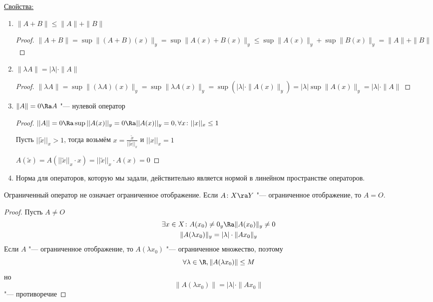 \underline{Свойства:}
\begin{enumerate}
\item
	$\|A + B\| \le \|A\| + \|B\|$
	\begin{proof}
		$\|A + B\| = \sup \|(A + B)(x)\|_y = \sup \|A(x) + B(x)\|_y \le \sup \|A(x)\|_y + \sup \|B(x)\|_y = \|A\| + \|B\|$
	\end{proof}

\item
	$\|\lambda A\| = |\lambda| \cdot \|A\|$
	\begin{proof}
		$\|\lambda A\| = \sup \| (\lambda A)(x) \|_y = \sup \| \lambda A(x) \|_y = \sup( |\lambda| \cdot \|A(x) \|_y) = |\lambda| \sup \|A(x)\|_y = |\lambda| \cdot \|A\|$
	\end{proof}

\item
	$\|A\| = 0 \Ra A$ "--- нулевой оператор
	\begin{proof}
		$||A|| = 0 \Ra \sup ||A(x)||_y = 0 \Ra ||A(x)||_y = 0, \forall x \colon ||x||_x \le 1$
		
		Пусть $||\widetilde{x}||_x > 1$, тогда возьмём $x = \frac{\widetilde{x}}{||\widetilde{x}||_x}$ и $||x||_x = 1$
		
		$A(\widetilde{x}) = A(||\widetilde{x}||_x \cdot x) = ||\widetilde{x}||_x \cdot A(x) = 0$
	\end{proof}

\item
	Норма для операторов, которую мы задали, действительно является нормой в линейном пространстве операторов.
\end{enumerate}

\begin{Rem}
	Ограниченный оператор не означает ограниченное отображение. Если $A \colon X \ra Y$ "--- ограниченное отображение, то $A = O$.
\end{Rem}
\begin{proof}
	Пусть $A \ne O$
	\begin{gather*}
		\exists x \in X \colon A(x_0) \ne 0_y \Ra \|A(x_0)\|_y \ne 0 \\
		\|A(\lambda x_0)\|_y = |\lambda| \cdot \|Ax_0\|_y
	\end{gather*}
	Если $A$ "--- ограниченное отображение, то $A(\lambda x_0)$ "--- ограниченное множество, поэтому
	\[ \forall \lambda \in \R, \|A(\lambda x_0)\| \le M \]
	но
	\[ \|A(\lambda x_0)\| = |\lambda| \cdot \|Ax_0\| \]
	"--- противоречие
\end{proof}

